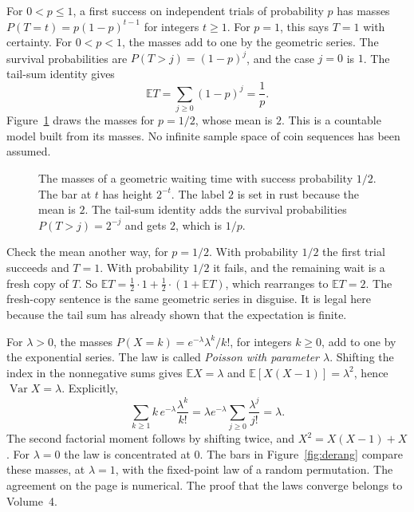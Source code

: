 \begin{examplex}
For $0<p\le1$, a first success on independent trials of probability $p$ has masses $P(T=t)=p(1-p)^{t-1}$ for integers $t\ge1$. For $p=1$, this says $T=1$ with certainty. For $0<p<1$, the masses add to one by the geometric series. The survival probabilities are $P(T>j)=(1-p)^j$, and the case $j=0$ is $1$. The tail-sum identity gives
\[
 \mathbb ET=\sum_{j\ge0}(1-p)^j=\frac1p.
\]
Figure~\ref{fig:geomwait} draws the masses for $p=1/2$, whose mean is $2$. This is a countable model built from its masses. No infinite sample space of coin sequences has been assumed.
\end{examplex}

\begin{figure}[ht]
\centering
{}
\caption{The masses of a geometric waiting time with success probability $1/2$. The bar at $t$ has height $2^{-t}$. The label $2$ is set in rust because the mean is $2$. The tail-sum identity adds the survival probabilities $P(T>j)=2^{-j}$ and gets $2$, which is $1/p$.}
\label{fig:geomwait}
\end{figure}

Check the mean another way, for $p=1/2$. With probability $1/2$ the first trial succeeds and $T=1$. With probability $1/2$ it fails, and the remaining wait is a fresh copy of $T$. So $\mathbb ET=\tfrac12\cdot1+\tfrac12\cdot(1+\mathbb ET)$, which rearranges to $\mathbb ET=2$. The fresh-copy sentence is the same geometric series in disguise. It is legal here because the tail sum has already shown that the expectation is finite.

\begin{examplex}
For $\lambda>0$, the masses $P(X=k)=e^{-\lambda}\lambda^k/k!$, for integers $k\ge0$, add to one by the exponential series. The law is called \emph{Poisson with parameter $\lambda$}. Shifting the index in the nonnegative sums gives $\mathbb EX=\lambda$ and $\mathbb E[X(X-1)]=\lambda^2$, hence $\operatorname{Var}X=\lambda$. Explicitly,
\[
 \sum_{k\ge1}k\,e^{-\lambda}\frac{\lambda^k}{k!}
 =\lambda e^{-\lambda}\sum_{j\ge0}\frac{\lambda^j}{j!}=\lambda.
\]
The second factorial moment follows by shifting twice, and $X^2=X(X-1)+X$. For $\lambda=0$ the law is concentrated at $0$. The bars in Figure~\ref{fig:derang} compare these masses, at $\lambda=1$, with the fixed-point law of a random permutation. The agreement on the page is numerical. The proof that the laws converge belongs to Volume~4.
\end{examplex}

